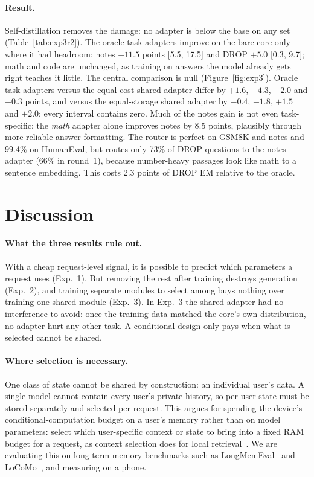 \documentclass[11pt]{article}
\begin{document}
\paragraph{Result.} Self-distillation removes the damage: no adapter is below the base on any set
(Table~\ref{tab:exp3r2}). The oracle task adapters improve on the bare core only where it had headroom:
notes $+11.5$ points [5.5, 17.5] and DROP $+5.0$ [0.3, 9.7]; math and code are unchanged, as training on
answers the model already gets right teaches it little. The central comparison is null
(Figure~\ref{fig:exp3}). Oracle task adapters versus the equal-cost shared adapter differ by $+1.6$,
$-4.3$, $+2.0$ and $+0.3$ points, and versus the equal-storage shared adapter by $-0.4$, $-1.8$, $+1.5$ and
$+2.0$; every interval contains zero. Much of the notes gain is not even task-specific: the \emph{math}
adapter alone improves notes by 8.5 points, plausibly through more reliable answer formatting. The router
is perfect on GSM8K and notes and 99.4\% on HumanEval, but routes only 73\% of DROP questions to the notes
adapter (66\% in round~1), because number-heavy passages look like math to a sentence embedding. This
costs 2.3 points of DROP EM relative to the oracle.

\section{Discussion}
\label{sec:discussion}
\paragraph{What the three results rule out.} With a cheap request-level signal, it is possible to predict
which parameters a request uses (Exp.~1). But removing the rest after training destroys generation
(Exp.~2), and training separate modules to select among buys nothing over training one shared module
(Exp.~3). In Exp.~3 the shared adapter had no interference to avoid: once the training data matched the
core's own distribution, no adapter hurt any other task. A conditional design only pays when what is
selected cannot be shared.

\paragraph{Where selection is necessary.} One class of state cannot be shared by construction: an
individual user's data. A single model cannot contain every user's private history, so per-user state
must be stored separately and selected per request. This argues for spending the device's
conditional-computation budget on a user's memory rather than on model parameters: select which
user-specific context or state to bring into a fixed RAM budget for a request, as context selection does
for local retrieval~\cite{ulhaq2026cortex}. We are evaluating this on long-term memory benchmarks such as
LongMemEval~\cite{wu2024longmemeval} and LoCoMo~\cite{maharana2024locomo}, and measuring on a phone.
\end{document}

